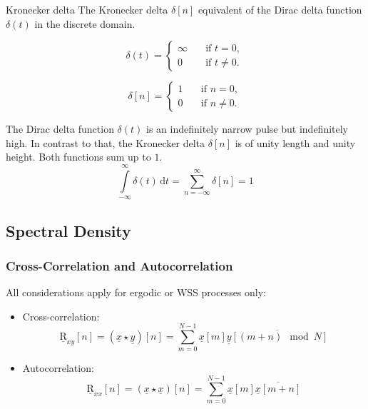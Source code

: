 \begin{refsection}
\begin{excursus}{Kronecker delta}
	The  Kronecker delta $\delta[n]$ equivalent of the Dirac delta function $\delta(t)$ in the discrete domain.
	
	\begin{equation*}
		\delta(t) = \begin{cases}
			\infty & \quad \text{if } t = 0, \\
			0 & \quad \text{if } t \neq 0.
		\end{cases}
	\end{equation*}
	
	\begin{equation*}
		\delta[n] = \begin{cases}
			1 & \quad \text{if } n = 0, \\
			0 & \quad \text{if } n \neq 0.
		\end{cases}
	\end{equation*}
	
	The Dirac delta function $\delta(t)$ is an indefinitely narrow pulse but indefinitely high. In contrast to that, the Kronecker delta $\delta[n]$ is of unity length and unity height. Both functions sum up to $1$.
	\begin{equation}
		\int\limits_{-\infty}^{\infty} \delta(t) \, \mathrm{d} t = \sum\limits_{n = -\infty}^{\infty} \delta[n] = 1
	\end{equation}
\end{excursus}

\subsection{Spectral Density}

\subsubsection{Cross-Correlation and Autocorrelation}

All considerations apply for ergodic or \ac{WSS} processes only:

\begin{itemize}
	\item Cross-correlation:
	\begin{equation}
		\underline{\mathrm{R}}_{xy}[n] = \left(\underline{x} \star \underline{y}\right)[n] = \sum\limits_{m=0}^{N-1} \underline{x}[m] \overline{\underline{y}[(m+n) \mod N]}
	\end{equation}
	\item Autocorrelation:
	\begin{equation}
		\underline{\mathrm{R}}_{xx}[n] = \left(\underline{x} \star \underline{x}\right)[n] = \sum\limits_{m=0}^{N-1} \underline{x}[m] \overline{\underline{x}[m+n]}
	\end{equation}
\end{itemize}


\end{refsection}
